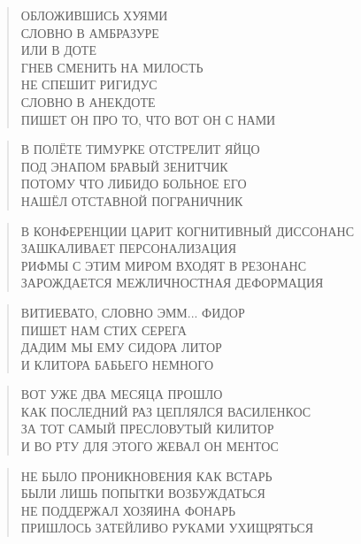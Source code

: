 \poemtitle{***}
\begin{verse}
ОБЛОЖИВШИСЬ ХУЯМИ\\
СЛОВНО В АМБРАЗУРЕ\\
ИЛИ В ДОТЕ\\
ГНЕВ СМЕНИТЬ НА МИЛОСТЬ\\
НЕ СПЕШИТ РИГИДУС\\
СЛОВНО В АНЕКДОТЕ\\
ПИШЕТ ОН ПРО ТО, ЧТО ВОТ ОН С НАМИ
\end{verse}

\poemtitle{***}
\begin{verse}
В ПОЛЁТЕ ТИМУРКЕ ОТСТРЕЛИТ ЯЙЦО\\
ПОД ЭНАПОМ БРАВЫЙ ЗЕНИТЧИК\\
ПОТОМУ ЧТО ЛИБИДО БОЛЬНОЕ ЕГО\\
НАШЁЛ ОТСТАВНОЙ ПОГРАНИЧНИК
\end{verse}

\poemtitle{***}
\begin{verse}
В КОНФЕРЕНЦИИ ЦАРИТ КОГНИТИВНЫЙ ДИССОНАНС \\
ЗАШКАЛИВАЕТ ПЕРСОНАЛИЗАЦИЯ\\
РИФМЫ С ЭТИМ МИРОМ ВХОДЯТ В РЕЗОНАНС\\
ЗАРОЖДАЕТСЯ МЕЖЛИЧНОСТНАЯ ДЕФОРМАЦИЯ
\end{verse}

\poemtitle{***}
\begin{verse}
ВИТИЕВАТО, СЛОВНО ЭММ... ФИДОР\\
ПИШЕТ НАМ СТИХ СЕРЕГА\\
ДАДИМ МЫ ЕМУ СИДОРА ЛИТОР\\
И КЛИТОРА БАБЬЕГО НЕМНОГО
\end{verse}

\poemtitle{***}
\begin{verse}
ВОТ УЖЕ ДВА МЕСЯЦА ПРОШЛО\\
КАК ПОСЛЕДНИЙ РАЗ ЦЕПЛЯЛСЯ ВАСИЛЕНКОС\\
ЗА ТОТ САМЫЙ ПРЕСЛОВУТЫЙ КИЛИТОР\\
И ВО РТУ ДЛЯ ЭТОГО ЖЕВАЛ ОН МЕНТОС
\end{verse}

\poemtitle{***}
\begin{verse}
НЕ БЫЛО ПРОНИКНОВЕНИЯ КАК ВСТАРЬ\\
БЫЛИ ЛИШЬ ПОПЫТКИ ВОЗБУЖДАТЬСЯ\\
НЕ ПОДДЕРЖАЛ ХОЗЯИНА ФОНАРЬ\\
ПРИШЛОСЬ ЗАТЕЙЛИВО РУКАМИ УХИЩРЯТЬСЯ
\end{verse}

